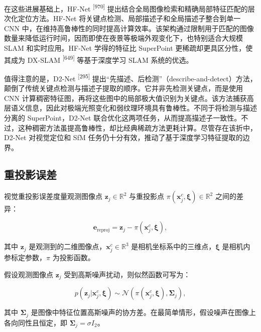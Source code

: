 在这些进展基础上，HF-Net \textsuperscript{[970]} 提出结合全局图像检索和精确局部特征匹配的层次化定位方法。HF-Net 将关键点检测、局部描述子和全局描述子整合到单一 CNN 中，在维持高鲁棒性的同时提高计算效率。该架构通过限制用于匹配的图像数量来降低运行时间，因而即使在夜景等极端外观变化下，也特别适合大规模 SLAM 和实时应用。HF-Net 学得的特征比 SuperPoint 更稀疏却更具区分性，使其成为 DX-SLAM \textsuperscript{[649]} 等基于深度学习 SLAM 系统的优选。

值得注意的是，D2-Net \textsuperscript{[295]} 提出“先描述、后检测”（describe-and-detect）方法，颠倒了传统关键点检测与描述子提取的顺序。它并非先检测关键点，而是使用 CNN 计算稠密特征图，再将这些图中的局部极大值识别为关键点。该方法捕获高层语义信息，因此对极端光照变化和弱纹理环境具有鲁棒性。不同于将检测与描述分离的 SuperPoint，D2-Net 联合优化这两项任务，从而提高描述子一致性。不过，这种稠密方法虽提高鲁棒性，却比经典稀疏方法更耗计算。尽管存在该折中，D2-Net 对视觉定位和 SfM 任务仍十分有效，推动了基于深度学习特征提取的边界。

\subsection{重投影误差}

视觉重投影误差度量观测图像点 $\boldsymbol {z} _ { j } \in \mathbb { R } ^ { 2 }$ 与重投影点 $\pi ( \pmb { x } _ { j } ^ { c } , \pmb { \xi } ) \in \mathbb { R } ^ { 2 }$ 之间的差异：

\begin{equation*}
\boldsymbol {e} _ {\mathrm{reproj}} = \boldsymbol {z} _ {j} - \pi (\boldsymbol {x} _ {j} ^ {c}, \boldsymbol {\xi}),
\end{equation*}

其中 $\boldsymbol {z} _ { j }$ 是观测到的二维图像点，$\pmb { x } _ { j } ^ { c } \in \mathbb { R } ^ { 3 }$ 是相机坐标系中的三维点，$\boldsymbol { \xi }$ 是相机内参标定参数，$\pi$ 为投影函数。

假设观测图像点 $\boldsymbol {z} _ { j }$ 受到高斯噪声扰动，则似然函数可写为：

\begin{equation*}
p (\boldsymbol {z} _ {j} | \boldsymbol {x} _ {j} ^ {c}, \boldsymbol {\xi}) \sim \mathcal {N} \left(\pi (\boldsymbol {x} _ {j} ^ {c}, \boldsymbol {\xi}), \boldsymbol {\Sigma} _ {j}\right),
\end{equation*}

其中 $\boldsymbol {\Sigma} _ { j }$ 是图像中特征位置高斯噪声的协方差。在最简单情形，假设噪声在图像上各向同性且恒定，即 $\boldsymbol {\Sigma} _ { j } = \sigma I _ { 2 }$。

